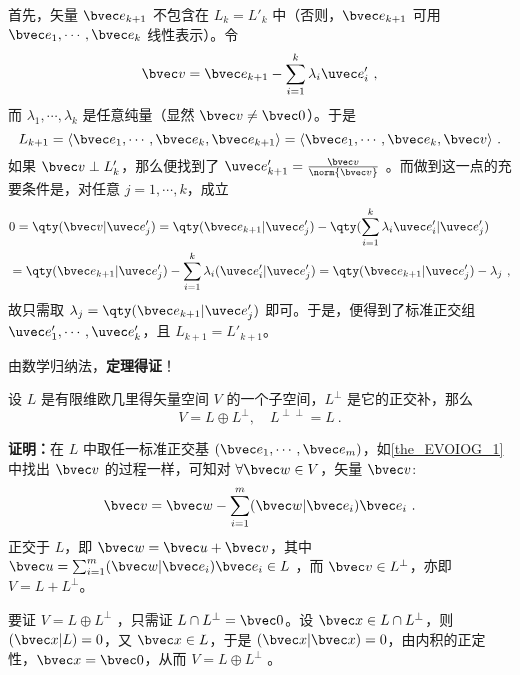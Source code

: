 首先，矢量 $\bvec e_{k+1}$ 不包含在 $L_k=L'_k$ 中（否则，$\bvec e_{k+1}$ 可用 $\bvec e_1,\cdots,\bvec e_k$ 线性表示）。令
\begin{equation}
\bvec v=\bvec e_{k+1}-\sum_{i=1}^{k}\lambda_i\uvec e'_i~,
\end{equation}
而 $\lambda_1,\cdots,\lambda_k$ 是任意纯量（显然 $\bvec v\neq\bvec 0$）。于是
\begin{equation}
L_{k+1}=\langle\bvec e_1,\cdots,\bvec e_k,\bvec e_{k+1}\rangle=\langle\bvec e_1,\cdots,\bvec e_k,\bvec v\rangle~.
\end{equation}
如果 $\bvec v\perp L'_k$，那么便找到了 $\uvec e'_{k+1}=\frac{\bvec v}{\norm{\bvec v}}$ 。而做到这一点的充要条件是，对任意 $j=1,\cdots,k$，成立
\begin{equation}
\begin{aligned}
&0=\qty(\bvec v|\uvec e'_j)=\qty(\bvec e_{k+1}|\uvec e'_j)-\qty(\sum_{i=1}^k\lambda_i\uvec e'_i|\uvec e'_j)\\
&=\qty(\bvec e_{k+1}|\uvec e'_j)-\sum_{i=1}^k\lambda_i(\uvec e'_i|\uvec e'_j)=\qty(\bvec e_{k+1}|\uvec e'_j)-\lambda_j~,
\end{aligned}
\end{equation}
故只需取 $\lambda_j=\qty(\bvec e_{k+1}|\uvec e'_j)$ 即可。于是，便得到了标准正交组 $\uvec e'_1,\cdots,\uvec e'_k$，且 $L_{k+1}=L'_{k+1}$。

由数学归纳法，\textbf{定理得证}！

\begin{theorem}{}\label{the_EVOIOG_2}
设 $L$ 是有限维欧几里得矢量空间 $V$ 的一个子空间，$L^{\perp}$ 是它的正交补，那么
\begin{equation}
V=L\oplus L^{\perp},\quad L^{\perp\perp}=L~.
\end{equation}
\end{theorem}
\textbf{证明：}在 $L$ 中取任一标准正交基 $(\bvec e_1,\cdots,\bvec e_m)$，如\autoref{the_EVOIOG_1} 中找出 $\bvec v$ 的过程一样，可知对 $\forall \bvec w\in V$，矢量 $\bvec v$:
\begin{equation}
\bvec v=\bvec w-\sum_{i=1}^m(\bvec w|\bvec e_i)\bvec e_i~.
\end{equation}
正交于 $L$，即 $\bvec w=\bvec u+\bvec v$，其中 $\bvec u=\sum_{i=1}^m(\bvec w|\bvec e_i)\bvec e_i\in L$ ，而 $\bvec v\in L^{\perp}$，亦即 $V=L+L^{\perp}$。

要证 $V=L\oplus L^{\perp}$ ，只需证 $L\cap L^{\perp}=\bvec 0$。设 $\bvec x\in L\cap L^{\perp}$，则 $(\bvec x|L)=0$，又 $\bvec x\in L$，于是 $(\bvec x|\bvec x)=0$，由内积的正定性，$\bvec x=\bvec 0$，从而 $V=L\oplus L^{\perp}$ 。

